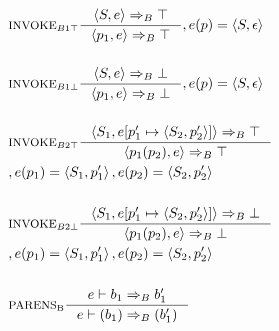 \begin{align*}
&\inference[$\text{INVOKE}_{B1\top}$]{\Braket{S,e} \Rightarrow_B \top}
                  {\Braket{p_1,e} \Rightarrow_B \top}
                  {,e(p) = \Braket{S,\epsilon}}
\\\\
&\inference[$\text{INVOKE}_{B1\bot}$]{\Braket{S,e} \Rightarrow_B \bot}
                  {\Braket{p_1,e} \Rightarrow_B \bot}
                  {,e(p) = \Braket{S,\epsilon}}
\\\\
&\inference[$\text{INVOKE}_{B2\top}$]{\Braket{S_1,e[p_1' \mapsto \Braket{S_2,p_2'}]} \Rightarrow_B \top}
                  {\Braket{p_1(p_2),e} \Rightarrow_B \top}
\\                  
&                 {,e(p_1) = \Braket{S_1,p_1'}, e(p_2) = \Braket{S_2,p_2'}}
\\\\
&\inference[$\text{INVOKE}_{B2\bot}$]{\Braket{S_1,e[p_1' \mapsto \Braket{S_2,p_2'}]} \Rightarrow_B \bot}
                  {\Braket{p_1(p_2),e} \Rightarrow_B \bot}
\\                  
&                 {,e(p_1) = \Braket{S_1,p_1'}, e(p_2) = \Braket{S_2,p_2'}}
\\\\
&\inference[$\text{PARENS}_\text{B}$]{e \vdash b_1 \Rightarrow_B b_1'}
                       {e \vdash (b_1) \Rightarrow_B (b_1')}
\end{align*}

